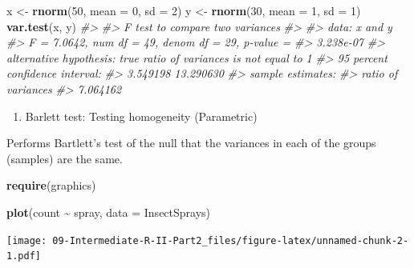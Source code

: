 \documentclass[
]{book}
\newenvironment{Shaded}{\begin{snugshade}}{\end{snugshade}}
\newcommand{\AttributeTok}[1]{\textcolor[rgb]{0.13,0.29,0.53}{#1}}
\newcommand{\CommentTok}[1]{\textcolor[rgb]{0.56,0.35,0.01}{\textit{#1}}}
\newcommand{\DecValTok}[1]{\textcolor[rgb]{0.00,0.00,0.81}{#1}}
\newcommand{\FunctionTok}[1]{\textcolor[rgb]{0.13,0.29,0.53}{\textbf{#1}}}
\newcommand{\NormalTok}[1]{#1}
\newcommand{\OtherTok}[1]{\textcolor[rgb]{0.56,0.35,0.01}{#1}}
\newcommand{\SpecialCharTok}[1]{\textcolor[rgb]{0.81,0.36,0.00}{\textbf{#1}}}
\providecommand{\tightlist}{%
  \setlength{\itemsep}{0pt}\setlength{\parskip}{0pt}}
\begin{document}
\begin{Shaded}
\begin{Highlighting}[]
\NormalTok{x }\OtherTok{\textless{}{-}} \FunctionTok{rnorm}\NormalTok{(}\DecValTok{50}\NormalTok{, }\AttributeTok{mean =} \DecValTok{0}\NormalTok{, }\AttributeTok{sd =} \DecValTok{2}\NormalTok{)}
\NormalTok{y }\OtherTok{\textless{}{-}} \FunctionTok{rnorm}\NormalTok{(}\DecValTok{30}\NormalTok{, }\AttributeTok{mean =} \DecValTok{1}\NormalTok{, }\AttributeTok{sd =} \DecValTok{1}\NormalTok{)}
\FunctionTok{var.test}\NormalTok{(x, y)}
\CommentTok{\#\textgreater{} }
\CommentTok{\#\textgreater{}  F test to compare two variances}
\CommentTok{\#\textgreater{} }
\CommentTok{\#\textgreater{} data:  x and y}
\CommentTok{\#\textgreater{} F = 7.0642, num df = 49, denom df = 29, p{-}value =}
\CommentTok{\#\textgreater{} 3.238e{-}07}
\CommentTok{\#\textgreater{} alternative hypothesis: true ratio of variances is not equal to 1}
\CommentTok{\#\textgreater{} 95 percent confidence interval:}
\CommentTok{\#\textgreater{}   3.549198 13.290630}
\CommentTok{\#\textgreater{} sample estimates:}
\CommentTok{\#\textgreater{} ratio of variances }
\CommentTok{\#\textgreater{}           7.064162}
\end{Highlighting}
\end{Shaded}

\begin{enumerate}
\def\labelenumi{\alph{enumi}.}
\setcounter{enumi}{1}
\tightlist
\item
  Barlett test: Testing homogeneity (Parametric)
\end{enumerate}

Performs Bartlett's test of the null that the variances in each of the groups (samples) are the same.

\begin{Shaded}
\begin{Highlighting}[]
\FunctionTok{require}\NormalTok{(graphics)}

\FunctionTok{plot}\NormalTok{(count }\SpecialCharTok{\textasciitilde{}}\NormalTok{ spray, }\AttributeTok{data =}\NormalTok{ InsectSprays)}
\end{Highlighting}
\end{Shaded}

\texttt{[image: 09-Intermediate-R-II-Part2\_files/figure-latex/unnamed-chunk-2-1.pdf]}

\begin{Shaded}
\end{Shaded}
\end{document}
